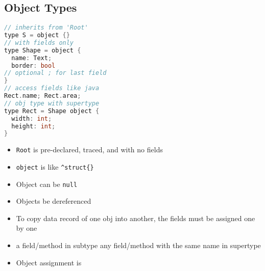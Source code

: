 \documentclass[10pt,a4paper,landscape]{article}
\begin{document}
\pagestyle{empty}

\begin{multicols*}{3}

\section*{Object Types}
\begin{minipage}{.5\linewidth}
\begin{lstlisting}[language=c]
// inherits from 'Root'
type S = object {}
// with fields only
type Shape = object {
  name: Text;
  border: bool
// optional ; for last field
}
// access fields like java
Rect.name; Rect.area;
// obj type with supertype
type Rect = Shape object {
  width: int;
  height: int;
}
\end{lstlisting}
\end{minipage}
\begin{minipage}{.5\linewidth}
  \flushleft
  \begin{itemize}
  \item \texttt{Root} is pre-declared, traced, and with no fields
  \item \texttt{object} is like \verb|^struct{}|
  \item Object can be \texttt{null}
  \item Objects  be dereferenced
  \item To copy data record of one obj into another, the fields must be assigned one by one
  \item a field/method in subtype  any field/method with the same name in supertype
  \item Object assignment is 
  \end{itemize}
\end{minipage}


\end{multicols*}
\end{document}
